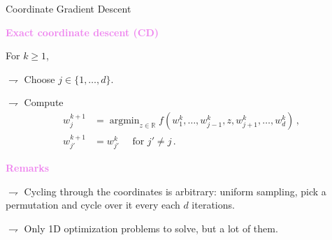 \documentclass[9pt]{beamer}
\DeclareMathOperator*{\argmin}{argmin}%
\newcommand\R{\mathds{R}}
\begin{document}
\begin{frame}{Coordinate Gradient Descent}

\textbf{\textcolor{violet}{Exact coordinate descent (CD)}}

 For $k\geqslant 1$,

$\rightharpoondown$ Choose $j \in \{ 1, \ldots, d \}$.

$\rightharpoondown$ Compute
\begin{align*}
w_{j}^{k+1} &= \argmin_{z \in \R} f(w_1^k, \ldots, w_{j-1}^k, 
z, w_{j+1}^k,
\ldots, w_d^k)\,, \\
w_{j'}^{k+1} &= w_{j'}^{k} \quad \text{ for } j' \neq j\,.
\end{align*}



\medskip 

\textbf{\textcolor{violet}{Remarks}}

$\rightharpoondown$ \alert{Cycling through the coordinates is arbitrary}: uniform sampling, pick a permutation and cycle over it every each $d$ iterations.

$\rightharpoondown$ Only \alert{1D optimization problems to solve}, but a lot of them.

\end{frame}
\end{document}
